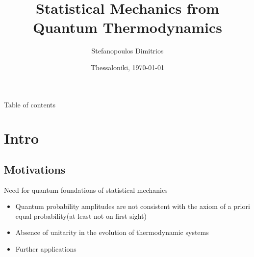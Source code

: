 \documentclass[handout]{beamer}
\begin{document}
\author[Stefanopoulos]{Stefanopoulos Dimitrios}
\title[Quantum Thermodynamics]{Statistical Mechanics from Quantum Thermodynamics}
\date{Thessaloniki, \today}
\frame{\titlepage}


\begin{frame}{Table of contents}
\tableofcontents
\end{frame}


\section{Intro}
\subsection{Motivations}
\begin{frame}{Need for quantum foundations of statistical mechanics}
\begin{itemize}
\item Quantum probability amplitudes are not consistent with the axiom of a priori equal probability(at least not on first sight)
\item Absence of unitarity in the evolution of thermodynamic systems
\item Further applications
\end{itemize}
\end{frame}
\end{document}
